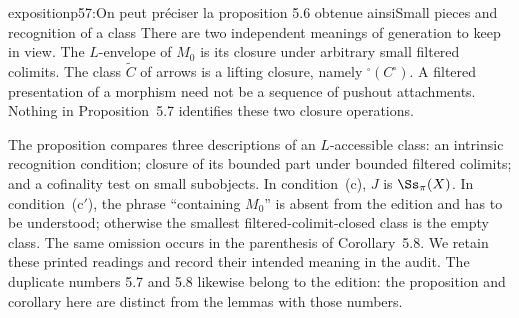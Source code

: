 \begin{dcomment}{exposition}{p57:On peut préciser la proposition 5.6 obtenue ainsi}{Small pieces and recognition of a class}
There are two independent meanings of generation to keep in view. The $L$-envelope of $M_0$ is its closure under arbitrary small filtered colimits. The class $\widetilde C$ of arrows is a lifting closure, namely ${}^{\square}(C^{\square})$. A filtered presentation of a morphism need not be a sequence of pushout attachments. Nothing in Proposition~5.7 identifies these two closure operations.

The proposition compares three descriptions of an $L$-accessible class: an intrinsic recognition condition; closure of its bounded part under bounded filtered colimits; and a cofinality test on small subobjects. In condition~(c), $J$ is $\Ss_\pi(X)$. In condition~(c$'$), the phrase ``containing $M_0$'' is absent from the edition and has to be understood; otherwise the smallest filtered-colimit-closed class is the empty class. The same omission occurs in the parenthesis of Corollary~5.8. We retain these printed readings and record their intended meaning in the audit. The duplicate numbers 5.7 and 5.8 likewise belong to the edition: the proposition and corollary here are distinct from the lemmas with those numbers.
\end{dcomment}

